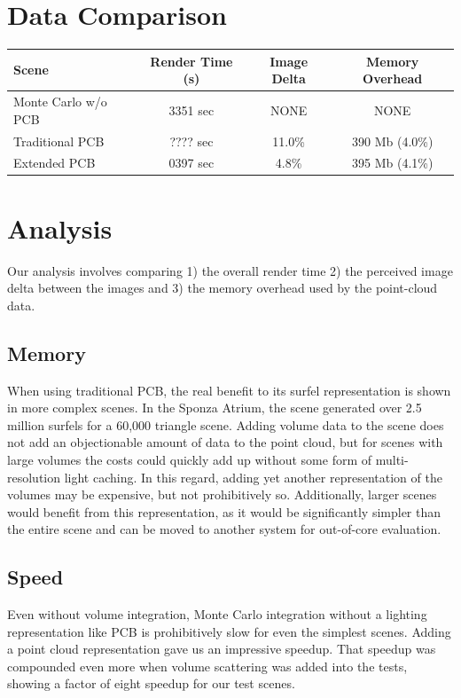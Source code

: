 \documentclass[12pt]{ucthesis}
\begin{document}
\section{Data Comparison}

\begin{center}
\setlength{\tabcolsep}{5pt}
\begin{tabular}{ | l | c | c | c | }
  \hline                       
  Scene & Render Time (s) & Image Delta & Memory Overhead \\
  \hline                  
  Monte Carlo w/o PCB & 3351 sec & NONE & NONE \\
  Traditional PCB & ???? sec & 11.0\% & 390 Mb (4.0\%) \\
  Extended PCB & 0397 sec & 4.8\% & 395 Mb (4.1\%)  \\
  \hline  
\end{tabular}
\end{center}


\section{Analysis}
Our analysis involves comparing 1) the overall render time 2) the perceived image delta between the images and 3) the memory overhead used by the point-cloud data.

\subsection{Memory}
When using traditional PCB, the real benefit to its surfel representation is shown in more complex scenes.  In the Sponza Atrium, the scene generated over 2.5 million surfels for a 60,000 triangle scene.  Adding volume data to the scene does not add an objectionable amount of data to the point cloud, but for scenes with large volumes the costs could quickly add up without some form of multi-resolution light caching.  In this regard, adding yet another representation of the volumes may be expensive, but not prohibitively so.  Additionally, larger scenes would benefit from this representation, as it would be significantly simpler than the entire scene and can be moved to another system for out-of-core evaluation.

\subsection{Speed}
Even without volume integration, Monte Carlo integration without a lighting representation like PCB is prohibitively slow for even the simplest scenes.  Adding a point cloud representation gave us an impressive speedup.  That speedup was compounded even more when volume scattering was added into the tests, showing a factor of eight speedup for our test scenes.
\end{document}
